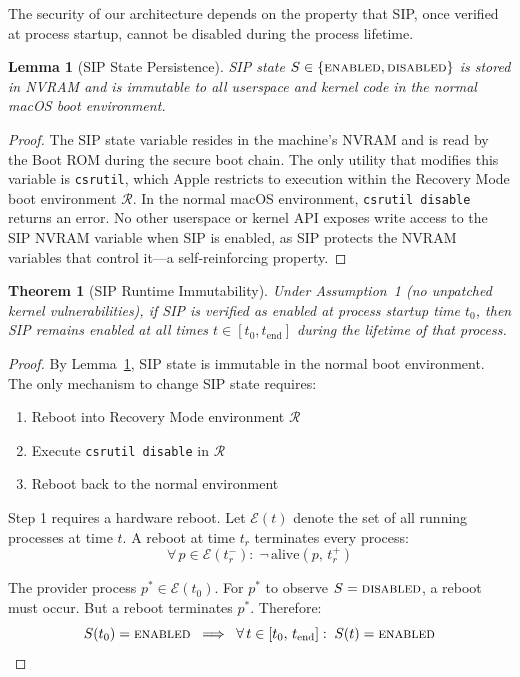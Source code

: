 \documentclass[10pt,twocolumn,letterpaper]{article}
\newtheorem{theorem}{Theorem}
\newtheorem{lemma}{Lemma}
\begin{document}
The security of our architecture depends on the property that SIP, once verified at process startup, cannot be disabled during the process lifetime.

\begin{lemma}[SIP State Persistence]
\label{lem:sip-nvram}
SIP state $S \in \{\textsc{enabled}, \textsc{disabled}\}$ is stored in NVRAM and is immutable to all userspace and kernel code in the normal macOS boot environment.
\end{lemma}

\begin{proof}
The SIP state variable resides in the machine's NVRAM and is read by the Boot ROM during the secure boot chain. The only utility that modifies this variable is \texttt{csrutil}, which Apple restricts to execution within the Recovery Mode boot environment $\mathcal{R}$. In the normal macOS environment, \texttt{csrutil disable} returns an error. No other userspace or kernel API exposes write access to the SIP NVRAM variable when SIP is enabled, as SIP protects the NVRAM variables that control it---a self-reinforcing property.
\end{proof}

\begin{theorem}[SIP Runtime Immutability]
\label{thm:sip}
Under Assumption~1 (no unpatched kernel vulnerabilities), if SIP is verified as enabled at process startup time $t_0$, then SIP remains enabled at all times $t \in [t_0, t_{\text{end}}]$ during the lifetime of that process.
\end{theorem}

\begin{proof}
By Lemma~\ref{lem:sip-nvram}, SIP state is immutable in the normal boot environment. The only mechanism to change SIP state requires:
\begin{enumerate}[leftmargin=*,itemsep=1pt]
    \item Reboot into Recovery Mode environment $\mathcal{R}$
    \item Execute \texttt{csrutil disable} in $\mathcal{R}$
    \item Reboot back to the normal environment
\end{enumerate}

Step 1 requires a hardware reboot. Let $\mathcal{E}(t)$ denote the set of all running processes at time $t$. A reboot at time $t_r$ terminates every process:
\begin{equation}
    \forall\, p \in \mathcal{E}(t_r^-):\; \lnot\,\text{alive}(p,\, t_r^+)
\end{equation}

The provider process $p^* \in \mathcal{E}(t_0)$. For $p^*$ to observe $S = \textsc{disabled}$, a reboot must occur. But a reboot terminates $p^*$. Therefore:
\begin{equation}
    S(t_0) = \textsc{enabled} \;\implies\; \forall\, t \in [t_0,\, t_{\text{end}}]:\; S(t) = \textsc{enabled}
\end{equation}
\end{proof}
\end{document}

